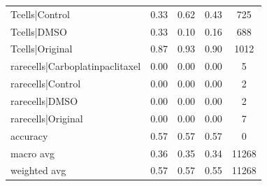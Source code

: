 \begin{table}[htbp]
\begin{tabular}{lcccc}
Tcells|Control & 0.33 & 0.62 & 0.43 & 725 \\
Tcells|DMSO & 0.33 & 0.10 & 0.16 & 688 \\
Tcells|Original & 0.87 & 0.93 & 0.90 & 1012 \\
rarecells|Carboplatinpaclitaxel & 0.00 & 0.00 & 0.00 & 5 \\
rarecells|Control & 0.00 & 0.00 & 0.00 & 2 \\
rarecells|DMSO & 0.00 & 0.00 & 0.00 & 2 \\
rarecells|Original & 0.00 & 0.00 & 0.00 & 7 \\
accuracy & 0.57 & 0.57 & 0.57 & 0 \\
macro avg & 0.36 & 0.35 & 0.34 & 11268 \\
weighted avg & 0.57 & 0.57 & 0.55 & 11268 \\
\end{tabular}
\end{table}
